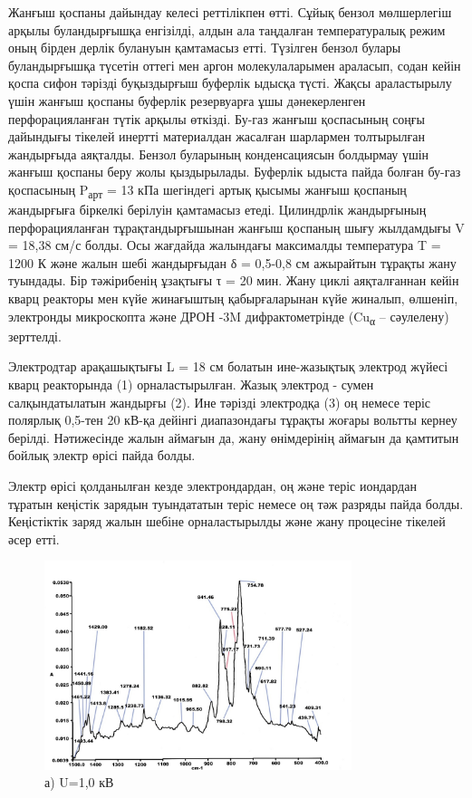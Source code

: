 \begin{multicols}{2}
Жанғыш қоспаны дайындау келесі реттілікпен өтті. Сұйық бензол
мөлшерлегіш арқылы буландырғышқа енгізілді, алдын ала таңдалған
температуралық режим оның бірден дерлік булануын қамтамасыз етті.
Түзілген бензол булары буландырғышқа түсетін оттегі мен аргон
молекулаларымен араласып, содан кейін қоспа сифон тәрізді буқыздырғыш
буферлік ыдысқа түсті. Жақсы араластырылу үшін жанғыш қоспаны буферлік
резервуарға ұшы дәнекерленген перфорацияланған түтік арқылы өткізді.
Бу-газ жанғыш қоспасының соңғы дайындығы тікелей инертті материалдан
жасалған шарлармен толтырылған жандырғыда аяқталды. Бензол буларының
конденсациясын болдырмау үшін жанғыш қоспаны беру жолы қыздырылады.
Буферлік ыдыста пайда болған бу-газ қоспасының P\textsubscript{арт} = 13
кПа шегіндегі артық қысымы жанғыш қоспаның жандырғыға біркелкі берілуін
қамтамасыз етеді. Цилиндрлік жандырғының перфорацияланған
тұрақтандырғышынан жанғыш қоспаның шығу жылдамдығы V = 18,38 см/с болды.
Осы жағдайда жалындағы максималды температура T = 1200 К және жалын шебі
жандырғыдан δ = 0,5-0,8 см ажырайтын тұрақты жану туындады. Бір
тәжірибенің ұзақтығы τ = 20 мин. Жану циклі аяқталғаннан кейін кварц
реакторы мен күйе жинағыштың қабырғаларынан күйе жиналып, өлшеніп,
электронды микроскопта және ДРОН -3M дифрактометрінде
(Cu\textsubscript{α} -- сәулелену) зерттелді.

Электродтар арақашықтығы L = 18 см болатын ине-жазықтық электрод жүйесі
кварц реакторында (1) орналастырылған. Жазық электрод - сумен
салқындатылатын жандырғы (2). Ине тәрізді электродқа (3) оң немесе теріс
полярлық 0,5-тен 20 кВ-қа дейінгі диапазондағы тұрақты жоғары вольтты
кернеу берілді. Нәтижесінде жалын аймағын да, жану өнімдерінің аймағын
да қамтитын бойлық электр өрісі пайда болды.

Электр өрісі қолданылған кезде электрондардан, оң және теріс иондардан
тұратын кеңістік зарядын туындататын теріс немесе оң тәж разряды пайда
болды. Кеңістіктік заряд жалын шебіне орналастырылды және жану процесіне
тікелей әсер етті.
\end{multicols}

\begin{figure}[H]
	\centering
	\includegraphics[width=0.8\textwidth]{assets/24}
	\caption*{а) U=1,0 кВ}
\end{figure}

